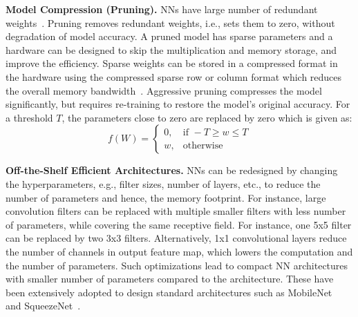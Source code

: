 \noindent\textbf{Model Compression (Pruning).} NNs have large number of redundant weights~\cite{}.
Pruning removes redundant weights, i.e., sets them to zero, without degradation of model accuracy.
A pruned model has sparse parameters and a hardware can be designed to skip the multiplication and memory storage, and improve the efficiency.
Sparse weights can be stored in a compressed format in the hardware using the compressed sparse row or column format which reduces the overall memory bandwidth~\cite{}.
Aggressive pruning compresses the model significantly, but requires re-training to restore the model's original accuracy.
For a threshold $T$, the parameters close to zero are replaced by zero which is given as:
\[
    f(W)=
\begin{cases}
    0, & \text{if } -T \geq w \leq T\\
    w,  & \text{otherwise}
\end{cases}
\]

\noindent\textbf{Off-the-Shelf Efficient Architectures.} NNs can be redesigned by changing the hyperparameters, e.g., filter sizes, number of layers, etc., to reduce the number of parameters and hence, the memory footprint.
For instance, large convolution filters can be replaced with multiple smaller filters with less number of parameters, while covering the same receptive field.
For instance, one 5x5 filter can be replaced by two 3x3 filters.
Alternatively, 1x1 convolutional layers reduce the number of channels in output feature map, which lowers the computation and the number of parameters.
Such optimizations lead to compact NN architectures with smaller number of parameters compared to the architecture.
These have been extensively adopted to design standard architectures such as MobileNet~\cite{conf/cvpr/SandlerHZZC18} and SqueezeNet~\cite{DBLP:journals/corr/IandolaMAHDK16}.


